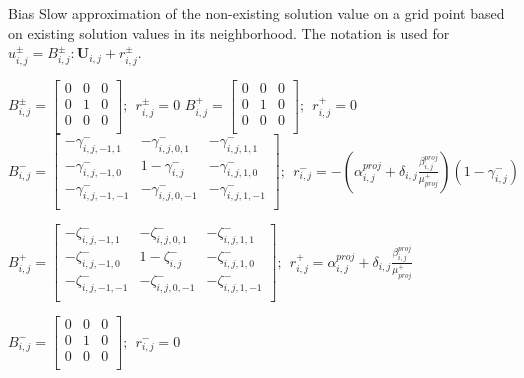 \documentclass{elsarticle}
\begin{document}
\begin{algorithm}
	\caption{Bias Slow approximation of the non-existing solution value on a grid point based on existing solution values in its neighborhood. The notation is used for $u_{i,j}^\pm=B_{i,j}^\pm : \mathbf{U}_{i,j}+r_{i,j}^\pm$.}\label{euclid}
	\begin{algorithmic}[1]
		\State $B_{i,j}^\pm=\begin{bmatrix}
				0 & 0 & 0 \\
				0 & 1 & 0 \\
				0 & 0 & 0 \\
			\end{bmatrix};\ \ r^\pm_{i,j}=0$
		\Else
		\State $B_{i,j}^+=\begin{bmatrix}
				0 & 0 & 0 \\
				0 & 1 & 0 \\
				0 & 0 & 0 \\
			\end{bmatrix};\ \ r^+_{i,j}=0$
		\State $B_{i,j}^-=\begin{bmatrix}
				-\gamma_{i,j,-1,1}^-  & -\gamma_{i,j,0,1}^-  & -\gamma_{i,j,1,1}^-  \\
				-\gamma_{i,j,-1,0}^-  & 1-\gamma^-_{i,j}     & -\gamma_{i,j,1,0}^-  \\
				-\gamma_{i,j,-1,-1}^- & -\gamma_{i,j,0,-1}^- & -\gamma_{i,j,1,-1}^- \\
			\end{bmatrix};\ \ r^-_{i,j}=-(\alpha_{i,j}^{proj} + \delta_{i,j}\frac{ \beta_{i,j}^{proj}}{\mu_{proj}^+}) (1 - \gamma_{i,j}^-)$
		\Else

		\State $B_{i,j}^+=\begin{bmatrix}
				-\zeta_{i,j,-1,1}^-  & -\zeta_{i,j,0,1}^-  & -\zeta_{i,j,1,1}^-  \\
				-\zeta_{i,j,-1,0}^-  & 1-\zeta^-_{i,j}     & -\zeta_{i,j,1,0}^-  \\
				-\zeta_{i,j,-1,-1}^- & -\zeta_{i,j,0,-1}^- & -\zeta_{i,j,1,-1}^- \\
			\end{bmatrix};\ \ r^+_{i,j}=\alpha_{i,j}^{proj} + \delta_{i,j}\frac{ \beta_{i,j}^{proj}}{\mu_{proj}^+}$

		\State $B_{i,j}^-=\begin{bmatrix}
				0 & 0 & 0 \\
				0 & 1 & 0 \\
				0 & 0 & 0 \\
			\end{bmatrix};\ \ r^-_{i,j}=0$


\end{algorithmic}
\end{algorithm}
\end{document}
